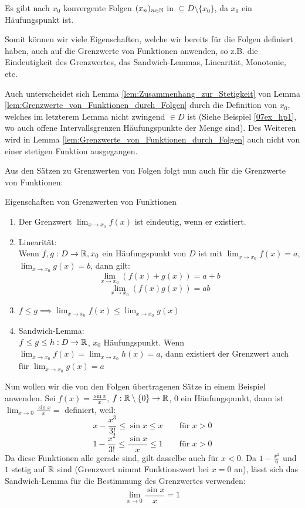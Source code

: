 \begin{remark}{1}
Es gibt nach $x_0$ konvergente Folgen $(x_n)_{n \in \mathbb{N}}$ in  $\subseteq D \setminus \{x_0\}$, da $x_0$ ein Häufungspunkt ist.
\end{remark}

Somit können wir viele Eigenschaften, welche wir bereits für die Folgen definiert haben, auch auf die Grenzwerte von Funktionen anwenden, so z.B. die Eindeutigkeit des Grenzwertes, das Sandwich-Lemmas, Linearität, Monotonie, etc.

\begin{remark}{2}
Auch unterscheidet sich Lemma \ref{lem:Zusammenhang_zur_Stetigkeit} von Lemma \ref{lem:Grenzwerte_von_Funktionen_durch_Folgen} durch die Definition von $x_0$, welches im letzterem Lemma nicht zwingend $\in D$ ist (Siehe Beispiel \ref{07ex_hp1}, wo auch offene Intervallsgrenzen Häufungspunkte der Menge sind). Des Weiteren wird in Lemma \ref{lem:Grenzwerte_von_Funktionen_durch_Folgen} auch nicht von einer stetigen Funktion ausgegangen.
\end{remark}

Aus den Sätzen zu Grenzwerten von Folgen folgt nun auch für die Grenzwerte von Funktionen:
\begin{satz}{Eigenschaften von Grenzwerten von Funktionen}{}
\begin{enumerate}
    \item Der Grenzwert $\lim_{x \to x_0} f(x)$ ist eindeutig, wenn er existiert.
    \item Linearität:\\Wenn $f,g:D \to \mathbb{R}, x_0$ ein Häufungspunkt von $D$ ist mit $\lim_{x \to x_0} f(x) = a$, $\lim_{x \to x_0} g(x) = b$, dann gilt:
    $$\lim_{x \to x_0}{\left( f(x) + g(x) \right) }= a + b$$
    $$\lim_{x \to x_0}{\left( f(x) g(x) \right) }= ab$$
    \item $f \leq g \implies \lim_{x \to x_0}{f(x)} \leq \lim_{x \to x_0}{g(x)}$
    \item Sandwich-Lemma:\\$f\leq g \leq h : D \to \mathbb{R}$, $x_0$ Häufungspunkt. Wenn $\lim_{x \to x_0}{f(x)}=\lim_{x \to x_0}{h(x)}=a$, dann existiert der Grenzwert auch für $\lim_{x \to x_0}{g(x)} = a$
\end{enumerate}
\end{satz}

\begin{example}
Nun wollen wir die von den Folgen übertragenen Sätze in einem Beispiel anwenden. Sei $f(x) = \frac{\sin{x}}{x}$, $f: \mathbb{R} \setminus \{0\} \to \mathbb{R}$, $0$ ein Häufungspunkt, dann ist$\lim_{x \to 0}{\frac{\sin{x}}{x}} = $ definiert, weil:
$$x -\frac{x^3}{3!} \leq \sin{x} \leq x \qquad \text{für } x > 0$$
$$1 -\frac{x^2}{3!} \leq \frac{\sin{x}}{x} \leq 1 \qquad \text{für } x > 0$$
Da diese Funktionen alle gerade sind, gilt dasselbe auch für $x<0$. Da $1-\frac{x^2}{6}$ und $1$ stetig auf $\mathbb{R}$ sind (Grenzwert nimmt Funktionswert bei $x=0$ an), lässt sich das Sandwich-Lemma für die Bestimmung des Grenzwertes verwenden:
$$\lim_{x \to 0}{\frac{\sin{x}}{x}} = 1$$
\end{example}

